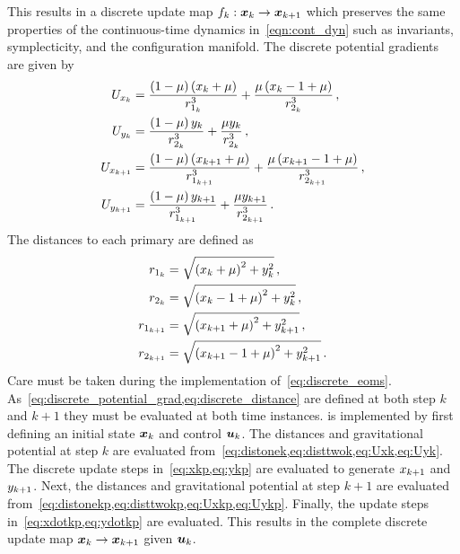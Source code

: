 \documentclass[smallcondensed]{svjour3}
\begin{document}
This results in a discrete update map \( f_k: \bm{x}_k \to \bm{x}_{k+1} \) which preserves the same properties of the continuous-time dynamics in~\cref{eqn:cont_dyn} such as invariants, symplecticity, and the configuration manifold.
The discrete potential gradients are given by
\begin{subequations}\label{eq:discrete_potential_grad}
\begin{align}
        U_{x_k} &= \frac{\left( 1 -\mu \right) \left( x_k + \mu \right)}{r_{1_k}^3} + \frac{ \mu \left( x_k -1 + \mu \right)}{r_{2_{k}}^3} \label{eq:Uxk} \, ,\\
        U_{y_{k}} &= \frac{\left( 1 -\mu \right) y_{k}}{r_{2_{k}}^3} + \frac{ \mu y_{k}}{r_{2_{k}}^3} \label{eq:Uyk} \, ,\\
        U_{x_{k+1}} &= \frac{\left( 1 -\mu \right) \left( x_{k+1} + \mu \right)}{r_{1_{k+1}}^3} + \frac{ \mu \left( x_{k+1} -1 + \mu \right)}{r_{2_{k+1}}^3} \label{eq:Uxkp}\, ,\\
        U_{y_{k+1}} &= \frac{\left( 1 -\mu \right) y_{k+1}}{r_{1_{k+1}}^3} + \frac{ \mu y_{k+1}}{r_{2_{k+1}}^3} \label{eq:Uykp} \, .
\end{align}     
\end{subequations}
The distances to each primary are defined as
\begin{subequations}\label{eq:discrete_distance}
\begin{align}
        r_{1_k} &= \sqrt{\left( x_k + \mu\right)^2 + y_{k}^2} \label{eq:distonek}\, ,\\
        r_{2_{k}} &= \sqrt{\left( x_k - 1 + \mu\right)^2 + y_{k}^2} \label{eq:disttwok}\, ,\\
        r_{1_{k+1}} &= \sqrt{\left( x_{k+1} + \mu\right)^2 + y_{k+1}^2} \label{eq:distonekp}\, ,\\
        r_{2_{k+1}} &= \sqrt{\left( x_{k+1} - 1 + \mu\right)^2 + y_{k+1}^2} \label{eq:disttwokp} \, .
\end{align}
\end{subequations}
Care must be taken during the implementation of~\cref{eq:discrete_eoms}.
As~\cref{eq:discrete_potential_grad,eq:discrete_distance} are defined at both step \( k \) and \( k+1 \) they must be evaluated at both time instances.
 is implemented by first defining an initial state \( \bm{x}_k \) and control \( \bm{u}_k \).
The distances and gravitational potential at step \( k \) are evaluated from~\cref{eq:distonek,eq:disttwok,eq:Uxk,eq:Uyk}.
The discrete update steps in~\cref{eq:xkp,eq:ykp} are evaluated to generate \( x_{k+1} \) and \( y_{k+1}\).
Next, the distances and gravitational potential at step \( k+1 \) are evaluated from~\cref{eq:distonekp,eq:disttwokp,eq:Uxkp,eq:Uykp}. 
Finally, the update steps in~\cref{eq:xdotkp,eq:ydotkp} are evaluated.
This results in the complete discrete update map \( \bm{x}_k \to \bm{x}_{k+1} \) given \( \bm{u}_k \).
\end{document}
